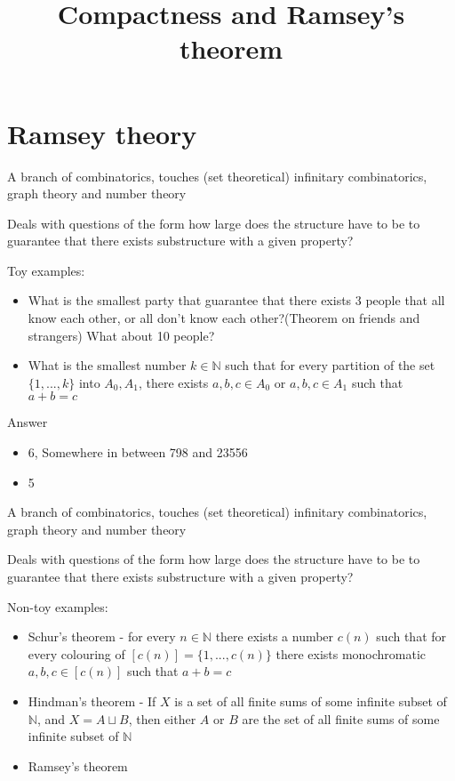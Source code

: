 

\title[Compactness and Ramsey's theorem]{Compactness and Ramsey's theorem}

	\frame{\titlepage}
	\section[Ramsey theory]{Ramsey theory}
	\begin{frame}
		A branch of combinatorics, touches (set theoretical) infinitary combinatorics, graph theory and number theory
		\begin{block}{Deals with questions of the form}
			how large does the structure have to be to guarantee that there exists substructure with a given property?
		\end{block}\pause
		Toy examples:
		\begin{itemize}
			\item What is the smallest party that guarantee that there exists 3 people that all know each other, or all don't know each other?(Theorem on friends and strangers) \pause What about 10 people?\pause
			\item What is the smallest number $k\in\mathbb{N}$ such that for every partition of the set $\{1,...,k\}$ into $A_0,A_1$, there exists $a,b,c\in A_0$ or $a,b,c\in A_1$ such that $a+b=c$
		\end{itemize}\pause
		Answer
		\begin{itemize}
			\item 6\pause, Somewhere in between 798 and 23556\pause
			\item 5
		\end{itemize}
	\end{frame}
	
	\begin{frame}
		A branch of combinatorics, touches (set theoretical) infinitary combinatorics, graph theory and number theory
		\begin{block}{Deals with questions of the form}
			how large does the structure have to be to guarantee that there exists substructure with a given property?
		\end{block}
		Non-toy examples:\pause
		\begin{itemize}
			\item Schur's theorem - for every $n\in\mathbb{N}$ there exists a number $c(n)$ such that for every colouring of $[c(n)]=\{1,...,c(n)\}$ there exists monochromatic $a,b,c\in[c(n)]$ such that $a+b=c$\pause
			\item Hindman's theorem - If $X$ is a set of all finite sums of some infinite subset of $\mathbb{N}$, and $X=A\sqcup B$, then either $A$ or $B$ are the set of all finite sums of some infinite subset of $\mathbb{N}$\pause
			\item Ramsey's theorem
		\end{itemize}
	\end{frame}
